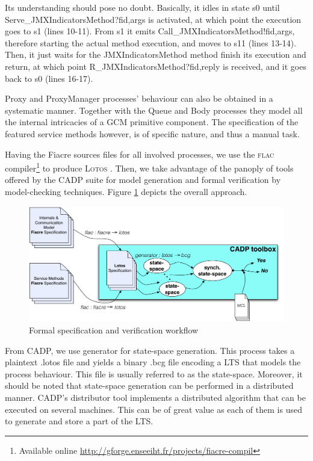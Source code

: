 	
	\noindent Its understanding should pose no doubt. Basically, it idles in state \textsf{s0} until
	\textsf{Serve\_JMXIndicatorsMethod?fid,args} is activated, at which point the execution goes to \textsf{s1} (lines 10-11).
	From \textsf{s1} it emits \textsf{Call\_JMXIndicatorsMethod!fid,args}, therefore starting the actual method
	execution, and moves to \textsf{s11} (lines 13-14). Then, it just waits for the \textsf{JMXIndicatorsMethod} method 
	finish its execution and return, at which point \textsf{R\_JMXIndicatorsMethod?fid,reply} is received, and 
	it goes back to \textsf{s0} (lines 16-17).	
	
		\textsf{Proxy} and \textsf{ProxyManager} processes' behaviour can also be obtained in a systematic 
	manner. Together with the \textsf{Queue} and \textsf{Body} processes they model all the internal
	intricacies of a \ac{GCM} primitive component. The specification of the featured service methods however,
	is of specific nature, and thus a manual task.    
	
	
		Having the Fiacre sources files for all involved processes, we use the \textsc{flac} 
	compiler\footnote{Available online \url{http://gforge.enseeiht.fr/projects/fiacre-compil}} to 
	produce \textsc{Lotos} \cite{Bolognesi:1987:IIS:44211.44214}.
   Then,  we take advantage of the panoply of tools offered by the 
   CADP suite \cite{garavel:inria-00583776} for model generation and formal
   verification by model-checking techniques. Figure \ref{fig:workflow} depicts the overall 
   approach.
          		
	\begin{figure}[H]
		\centering
		\includegraphics[scale=0.45]{figures/chapter3/mc.pdf}
		\caption{Formal specification and verification workflow}
		\label{fig:workflow}		
	\end{figure}		

	From CADP, we use \textsf{generator} for state-space generation. This process takes a plaintext
	\textsf{.lotos} file and yields a binary \textsf{.bcg} file encoding a \ac{LTS} that models
	the process behaviour. This file is usually referred to as the state-space. Moreover,
	it should be noted that state-space generation can be performed in a distributed manner.
	CADP's \textsf{distributor} tool implements a distributed algorithm that can be executed on several 
	machines. This can be of great value as	
	each of them is used to generate and store a part of the \ac{LTS}. 
	
